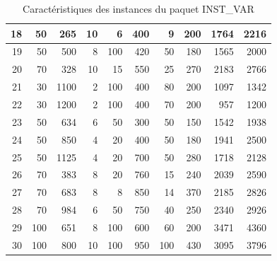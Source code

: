 {\begin{table}[H]
{\begin{tabular}{|r|r|r|r|r|r|r|r|r|r|}
			18	&	50	&	265	&	10	&	6	&	400	&	9	&	200	&	1764	&	2216	\\ \hline
			19	&	50	&	500	&	8	&	100	&	420	&	50	&	180	&	1565	&	2000	\\ \hline
			20	&	70	&	328	&	10	&	15	&	550	&	25	&	270	&	2183	&	2766	\\ \hline
			21	&	30	&	1100	&	2	&	100	&	400	&	80	&	200	&	1097	&	1342	\\ \hline
			22	&	30	&	1200	&	2	&	100	&	400	&	70	&	200	&	957	&	1200	\\ \hline
			23	&	50	&	634	&	6	&	50	&	300	&	50	&	150	&	1542	&	1938	\\ \hline
			24	&	50	&	850	&	4	&	20	&	400	&	50	&	180	&	1941	&	2500	\\ \hline
			25	&	50	&	1125	&	4	&	20	&	700	&	50	&	280	&	1718	&	2128	\\ \hline
			26	&	70	&	383	&	8	&	20	&	760	&	15	&	240	&	2039	&	2590	\\ \hline
			27	&	70	&	683	&	8	&	8	&	850	&	14	&	370	&	2185	&	2826	\\ \hline
			28	&	70	&	984	&	6	&	50	&	750	&	40	&	250	&	2340	&	2926	\\ \hline
			29	&	100	&	651	&	8	&	100	&	600	&	60	&	200	&	3471	&	4360	\\ \hline
			30	&	100	&	800	&	10	&	100	&	950	&	100	&	430	&	3095	&	3796	\\ \hline
			
			\bottomrule
		\end{tabular}%
	}\caption{Caractéristiques des instances du paquet INST\_VAR}
	\label{tab:inst}%
\end{table}%
}

